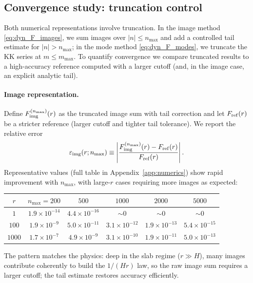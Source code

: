 \documentclass[11pt]{article}
\begin{document}
\subsection{Convergence study: truncation control}
\label{sec:numerics_convergence}

Both numerical representations involve truncation.  In the image method
\eqref{eq:dyn_F_images}, we sum images over $|n|\le n_{\max}$ and add a controlled tail estimate for
$|n|>n_{\max}$; in the mode method \eqref{eq:dyn_F_modes}, we truncate the KK series at
$m\le m_{\max}$.
To quantify convergence we compare truncated results to a high-accuracy reference computed with a
larger cutoff (and, in the image case, an explicit analytic tail).

\paragraph{Image representation.}
Define $F_{\rm img}^{(n_{\max})}(r)$ as the truncated image sum with tail correction and let
$F_{\rm ref}(r)$ be a stricter reference (larger cutoff and tighter tail tolerance).  We report the
relative error
\begin{equation}
  \varepsilon_{\rm img}(r;n_{\max}) \equiv
  \left|\frac{F_{\rm img}^{(n_{\max})}(r)-F_{\rm ref}(r)}{F_{\rm ref}(r)}\right|.
\end{equation}
Representative values (full table in Appendix~\ref{app:numerics}) show rapid improvement with
$n_{\max}$, with large-$r$ cases requiring more images as expected:
\begin{center}
\begin{tabular}{c|ccccc}
\hline
$r$ & $n_{\max}=200$ & $500$ & $1000$ & $2000$ & $5000$ \\
\hline
$1$     & $1.9\times 10^{-14}$ & $4.4\times 10^{-16}$ & $\sim 0$ & $\sim 0$ & $\sim 0$ \\
$100$   & $1.9\times 10^{-9}$  & $5.0\times 10^{-11}$ & $3.1\times 10^{-12}$ & $1.9\times 10^{-13}$ & $5.4\times 10^{-15}$ \\
$1000$  & $1.7\times 10^{-7}$  & $4.9\times 10^{-9}$  & $3.1\times 10^{-10}$ & $1.9\times 10^{-11}$ & $5.0\times 10^{-13}$ \\
\hline
\end{tabular}
\end{center}
The pattern matches the physics: deep in the slab regime ($r\gg H$), many images contribute
coherently to build the $1/(Hr)$ law, so the raw image sum requires a larger cutoff; the tail
estimate restores accuracy efficiently.
\end{document}

